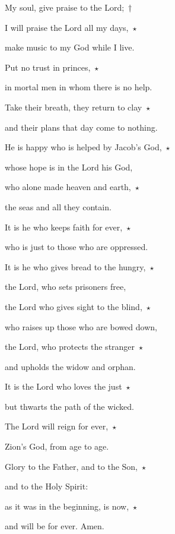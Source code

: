 \noindent My soul, give praise to the Lord;~†~\nopagebreak

I will praise the Lord all my days,~$\star$~\nopagebreak

make music to my God while I live.

\noindent Put no trust in princes,~$\star$~\nopagebreak

in mortal men in whom there is no help.

\noindent Take their breath, they return to clay~$\star$~\nopagebreak

and their plans that day come to nothing.

\noindent He is happy who is helped by Jacob’s God,~$\star$~\nopagebreak

whose hope is in the Lord his God,

\noindent who alone made heaven and earth,~$\star$~\nopagebreak

the seas and all they contain.

\noindent It is he who keeps faith for ever,~$\star$~\nopagebreak

who is just to those who are oppressed.

\noindent It is he who gives bread to the hungry,~$\star$~\nopagebreak

the Lord, who sets prisoners free,

\noindent the Lord who gives sight to the blind,~$\star$~\nopagebreak

who raises up those who are bowed down,

\noindent the Lord, who protects the stranger~$\star$~\nopagebreak

and upholds the widow and orphan.

\noindent It is the Lord who loves the just~$\star$~\nopagebreak

but thwarts the path of the wicked.

\noindent The Lord will reign for ever,~$\star$~\nopagebreak

Zion’s God, from age to age.

\noindent Glory to the Father, and to the Son,~$\star$~\nopagebreak

and to the Holy Spirit:

\noindent as it was in the beginning, is now,~$\star$~\nopagebreak

and will be for ever. Amen.
